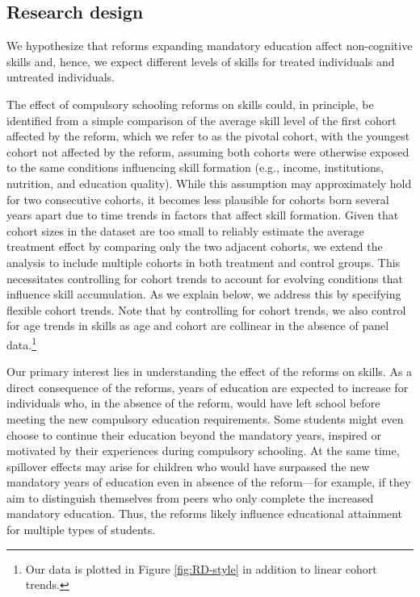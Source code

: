 
\subsection{Research design} \label{subsec:conc_frame}
We hypothesize that reforms expanding mandatory education affect non-cognitive skills and, hence, we expect different levels of skills for treated individuals and untreated individuals.

The effect of compulsory schooling reforms on skills could, in principle, be identified from a simple comparison of the average skill level of the first cohort affected by the reform, which we refer to as the pivotal cohort, with the youngest cohort  not affected by the reform, assuming both cohorts were otherwise exposed to the same conditions influencing skill formation (e.g., income, institutions, nutrition, and education quality).
While this assumption may approximately hold for two consecutive cohorts, it becomes less plausible for cohorts born several years apart due to time trends in factors that affect skill formation. Given that cohort sizes in the dataset are too small to reliably estimate the average treatment effect by comparing only the two adjacent cohorts, we extend the analysis to include multiple cohorts in both treatment and control groups. This necessitates controlling for cohort trends to account for evolving conditions that influence skill accumulation. As we explain below, we address this by specifying flexible cohort trends. Note that by controlling for cohort trends, we also control for age trends in skills as age and cohort are collinear in the absence of panel data.\footnote{Our data is plotted in Figure \ref{fig:RD-style} in addition to linear cohort trends.}


Our primary interest lies in understanding the effect of the reforms on skills. As a direct consequence of the reforms, years of education are expected to increase for individuals who, in the absence of the reform, would have left school before meeting the new compulsory education  requirements. Some students might even choose to continue their education beyond the mandatory years, inspired or motivated by their experiences during compulsory schooling. At the same time, spillover effects may arise for children who would have surpassed the new mandatory years of education even in absence of the reform---for example, if they aim to distinguish themselves from peers who only complete the increased mandatory education. Thus, the reforms likely influence educational attainment for multiple types of students.


